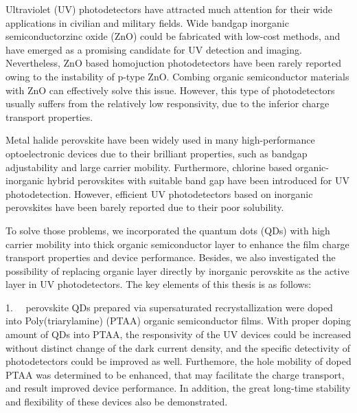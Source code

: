 


\begin{enabstract}%

Ultraviolet (UV) photodetectors have attracted much attention for their wide applications in civilian and military fields. Wide bandgap inorganic semiconductor{\textemdash}zinc oxide (ZnO) could be fabricated with low-cost methods, and have emerged as a promising candidate for UV detection and imaging. Nevertheless, ZnO based homojuction photodetectors have been rarely reported owing to the instability of p-type ZnO. Combing organic semiconductor materials with ZnO can effectively solve this issue. However, this type of photodetectors usually suffers from the relatively low responsivity, due to the inferior charge transport properties.

Metal halide perovskite have been widely used in many high-performance optoelectronic devices due to their brilliant properties, such as bandgap adjustability and large carrier mobility. Furthermore, chlorine based organic-inorganic hybrid perovskites with suitable band gap have been introduced for UV photodetection. However, efficient UV photodetectors based on inorganic perovskites have been barely reported due to their poor solubility.

To solve those problems, we incorporated the  quantum dots (QDs) with high carrier mobility into thick organic semiconductor layer to enhance the film charge transport properties and device performance. Besides, we also investigated the possibility of replacing organic layer directly by inorganic perovskite as the active layer in UV photodetectors. The key elements of this thesis is as follows:

1.\ \  perovskite QDs prepared via supersaturated recrystallization were doped into Poly(triarylamine) (PTAA) organic semiconductor films. With proper doping amount of  QDs into PTAA, the responsivity of the UV devices could be increased without distinct change of the dark current density, and the specific detectivity of photodetectors could be improved as well. Furthemore, the hole mobility of doped PTAA was determined to be enhanced, that may facilitate the charge transport, and result improved device performance. In addition, the great long-time stability and flexibility of these devices also be demonstrated.


\end{enabstract}
